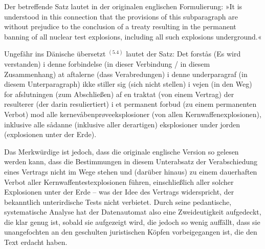 {%

Der betreffende Satz lautet in der originalen englischen Formulierung: »It is understood in this connection that the provisions of this subparagraph are without prejudice to the conclusion of a treaty resulting in the permanent banning of all nuclear test explosions, including all such explosions underground.« 

Ungefähr ins Dänische übersetzt $^{(5.4)}$ lautet der Satz: Det forstås (Es wird verstanden) i denne forbindelse (in dieser Verbindung / in diesem Zusammenhang) at aftalerne (dass Verabredungen) i denne underparagraf (in diesem Unterparagraph) ikke stiller sig (sich nicht stellen) i vejen (in den Weg) for afslutningen (zum Abschließen) af en traktat (von einem Vertrag) der resulterer (der darin resuliertiert) i et permanent forbud (zu einem permanenten Verbot) mod alle kernevåbenprøveeksplosioner (von allen Kernwaffenexplosionen), inklusive alle sådanne (inklusive aller derartigen) eksplosioner under jorden (explosionen unter der Erde).

Das Merkwürdige ist jedoch, dass die originale englische Version so gelesen werden kann, dass die Bestimmungen in diesem Unterabsatz der Verabschiedung eines Vertrags nicht im Wege stehen und (darüber hinaus) zu einem dauerhaften Verbot aller Kernwaffentestexplosionen führen, einschließlich aller solcher Explosionen unter der Erde -- was der Idee des Vertrags widerspricht, der bekanntlich unterirdische Tests nicht verbietet. Durch seine pedantische, systematische Analyse hat der Datenautomat also eine Zweideutigkeit aufgedeckt, die klar genug ist, sobald sie aufgezeigt wird, die jedoch so wenig auffällt, dass sie unangefochten an den geschulten juristischen Köpfen vorbeigegangen ist, die den Text erdacht haben.
}



